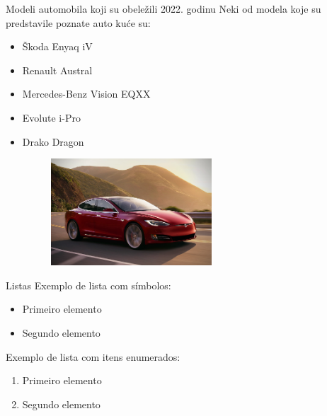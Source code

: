 \documentclass[11pt]{beamer}
\begin{document}
\begin{frame}{Modeli automobila koji su obeležili 2022. godinu}
Neki od modela koje su predstavile poznate auto kuće su:
\begin{itemize}
\item Škoda Enyaq iV
\item Renault Austral
\item Mercedes-Benz Vision EQXX
\item Evolute i-Pro
\item Drako Dragon

\begin{figure}[h]
        \centering
        \includegraphics[width=60mm, scale=0.5]{tesla.jpeg}
        \label{fig:tesla.jpeg}
        \end{figure}

\end{itemize}

\end{frame}

\begin{frame}{Listas}
    Exemplo de lista com símbolos:

    \begin{itemize}
        \item Primeiro elemento
        \item Segundo elemento
    \end{itemize}
    
    \bigskip
    
    Exemplo de lista com itens enumerados:
    
    \begin{enumerate}
        \item Primeiro elemento
        \item Segundo elemento
    \end{enumerate}
\end{frame}
\end{document}
